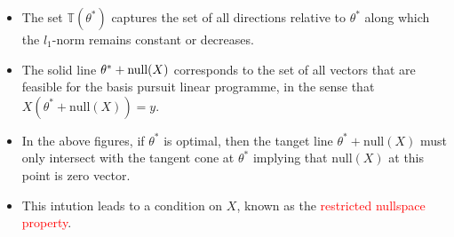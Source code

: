 \documentclass[10pt,handout,english]{beamer}
\newcommand{\T}{\mathbb{T}}
\begin{document}
\begin{frame}[allowframebreaks]
\begin{itemize}
\setlength\itemsep{0.5em}
\item{} The set $\T(\theta^{*})$ captures the set of all directions relative to $\theta^{*}$ along which the $l_{1}$-norm remains constant or decreases. 
\item{} The solid line $\theta^{*}+\textnormal{null}(X)$ corresponds to the set of all vectors that are feasible for the basis pursuit linear programme, in the sense that $X(\theta^{*}+\text{null}(X))=y$.
\item{} In the above figures, if $\theta^{*}$ is optimal, then the tanget line $\theta^{*}+\text{null}(X)$ must only intersect with the tangent cone at $\theta^{*}$ implying that $\text{null}(X)$ at this point is zero vector.\justifying 
\item{} This intution leads to a condition on $X$, known as the \textcolor{red}{restricted nullspace property}.
\end{itemize}
\end{frame}
\end{document}
